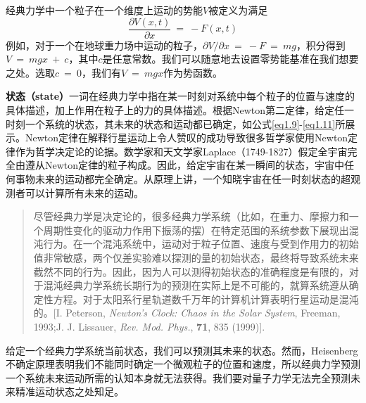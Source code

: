 \documentclass[12pt,a4paper,openany]{ctexbook}
\begin{document}
\begin{flushleft}
经典力学中一个粒子在一个维度上运动的势能$V$被定义为满足
\begin{equation}
    \boxed{\frac{\partial V(x,t)}{\partial{x}}\ =\ -F(x,t)}
    \label{eq1.12}
\end{equation}
例如，对于一个在地球重力场中运动的粒子，$\partial V/\partial x\ =\ -F\ =\ mg$，积分得到$V\ =\ mgx\ +\ c$，其中$c$是任意常数。我们可以随意地去设置零势能基准在我们想要之处。选取$c\ =\ 0$，我们有$V\ =\ mgx$作为势函数。

\textbf{状态（state）}一词在经典力学中指在某一时刻对系统中每个粒子的位置与速度的具体描述，加上作用在粒子上的力的具体描述。根据Newton第二定律，给定任一时刻一个系统的状态，其未来的状态和运动都已确定，如公式\eqref{eq1.9}-\eqref{eq1.11}所展示。Newton定律在解释行星运动上令人赞叹的成功导致很多哲学家使用Newton定律作为哲学决定论的论据。数学家和天文学家Laplace（1749-1827）假定全宇宙完全由遵从Newton定律的粒子构成。因此，给定宇宙在某一瞬间的状态，宇宙中任何事物未来的运动都完全确定。从原理上讲，一个知晓宇宙在任一时刻状态的超观测者可以计算所有未来的运动。
\begin{quote}
\small
尽管经典力学是决定论的，很多经典力学系统（比如，在重力、摩擦力和一个周期性变化的驱动力作用下振荡的摆）在特定范围的系统参数下展现出混沌行为。在一个混沌系统中，运动对于粒子位置、速度与受到作用力的初始值非常敏感，两个仅差实验难以探测的量的初始状态，最终将导致系统未来截然不同的行为。因此，因为人可以测得初始状态的准确程度是有限的，对于混沌经典力学系统长期行为的预测在实际上是不可能的，就算系统遵从确定性方程。对于太阳系行星轨道数千万年的计算机计算表明行星运动是混沌的。[I. Peterson, \textit{Newton’s Clock: Chaos in the Solar System}, Freeman, 1993;J. J. Lissauer, \textit{Rev. Mod. Phys.}, \textbf{71}, 835 (1999)].
\end{quote}

给定一个经典力学系统当前状态，我们可以预测其未来的状态。然而，Heisenberg不确定原理表明我们不能同时确定一个微观粒子的位置和速度，所以经典力学预测一个系统未来运动所需的认知本身就无法获得。我们要对量子力学无法完全预测未来精准运动状态之处知足。


\end{flushleft}
\end{document}
